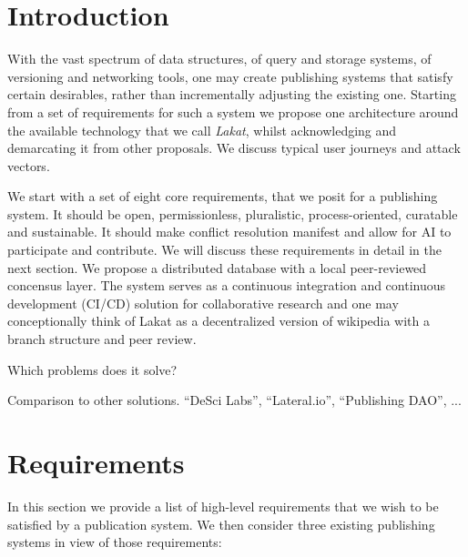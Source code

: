 \documentclass[14pt]{article}
\title{\sc{Lakat}\break \sc{A Publishing Architecture}}
\author{Leonhard Horstmeyer}
\date{\today}
\begin{document}
\maketitle

\tableofcontents

\begin{abstract}
    
\end{abstract}
\section{Introduction}

With the vast spectrum of data structures, of query and storage systems, of versioning and networking tools, one may create publishing systems that satisfy certain desirables, rather than incrementally adjusting the existing one. Starting from a set of requirements for such a system we propose one architecture around the available technology that we call \textit{Lakat}, whilst acknowledging and demarcating it from other proposals. We discuss typical user journeys and attack vectors.

We start with a set of eight core requirements, that we posit for a publishing system. It should be open, permissionless, pluralistic, process-oriented, curatable and sustainable. It should make conflict resolution manifest and allow for AI to participate and contribute. We will discuss these requirements in detail in the next section. We propose a distributed database with a local peer-reviewed concensus layer. The system serves as a continuous integration and continuous development (CI/CD) solution for collaborative research and one may conceptionally think of Lakat as a decentralized version of wikipedia with a branch structure and peer review.

Which problems does it solve?

Comparison to other solutions. 
``DeSci Labs'', ``Lateral.io'', ``Publishing DAO'', ...

\section{Requirements}

In this section we provide a list of high-level requirements that we wish to be satisfied by a publication system. We then consider three existing publishing systems in view of those requirements:
\end{document}
